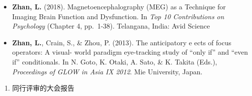 \documentclass[
  12pt,
]{article}
\providecommand{\tightlist}{%
  \setlength{\itemsep}{0pt}\setlength{\parskip}{0pt}}
\begin{document}
\begin{itemize}
\item
  \textbf{Zhan, L.} (2018). Magnetoencephalography (MEG) as a Technique
  for Imaging Brain Function and Dysfunction. In \emph{Top 10
  Contributions on Psychology} (Chapter 4, pp.~1-38). Telangana, India:
  Avid Science
\item
  \textbf{Zhan, L.}, Crain, S., \& Zhou, P. (2013). The anticipatory e
  ects of focus operators: A visual- world paradigm eye-tracking study
  of ``only if'' and ``even if'' conditionals. In N. Goto, K. Otaki, A.
  Sato, \& K. Takita (Eds.), \emph{Proceedings of GLOW in Asia IX 2012}.
  Mie University, Japan.
\end{itemize}

\begin{enumerate}
\def\labelenumi{\arabic{enumi}.}
\setcounter{enumi}{3}
\tightlist
\item
  同行评审的大会报告
\end{enumerate}
\end{document}

